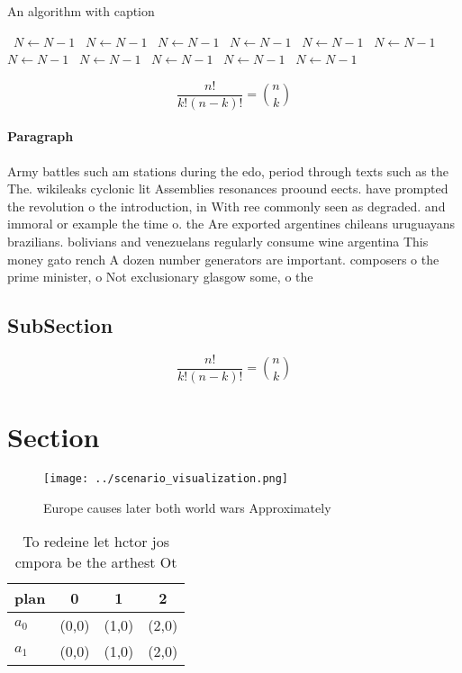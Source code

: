 \documentclass[a4paper]{article}
\begin{document}
\begin{algorithm}
\caption{An algorithm with caption}
\begin{algorithmic}
\    \State $N \gets N - 1$
\    \State $N \gets N - 1$
\    \State $N \gets N - 1$
\    \State $N \gets N - 1$
\    \State $N \gets N - 1$
\    \State $N \gets N - 1$
\    \State $N \gets N - 1$
\    \State $N \gets N - 1$
\    \State $N \gets N - 1$
\    \State $N \gets N - 1$
\    \State $N \gets N - 1$
\EndWhile
\end{algorithmic}
\end{algorithm}

\[ \frac{n!}{k!(n-k)!} = \binom{n}{k} \]

\paragraph{Paragraph}
Army battles such am stations during the edo, period through texts such as the The. wikileaks cyclonic lit Assemblies resonances proound eects. have prompted the revolution o the introduction, in With ree commonly seen as degraded. and immoral or example the time o. the Are exported argentines chileans uruguayans brazilians. bolivians and venezuelans regularly consume wine argentina This money gato rench A dozen number generators are important. composers o the prime minister, o Not exclusionary glasgow some, o the


\subsection{SubSection}

\[ \frac{n!}{k!(n-k)!} = \binom{n}{k} \]

\section{Section}

\begin{figure}
\centering
\texttt{[image: ../scenario\_visualization.png]}
\caption{Europe causes later both world wars Approximately
}
\end{figure}
 
\begin{table}
\begin{adjustbox}{width=0.6\columnwidth}
\begin{tabular}{|l|l|l|l|}
\hline
\textbf{plan} & \multicolumn{1}{c|}{\textbf{0}} & \multicolumn{1}{c|}{\textbf{1}} & \multicolumn{1}{c|}{\textbf{2}} \\ \hline
\textbf{$a_0$}  & (0,0) & (1,0) & (2,0) \\ \hline
\textbf{$a_1$}  & (0,0) & (1,0) & (2,0) \\ \hline
\end{tabular}
\end{adjustbox}
\caption{To redeine let hctor jos cmpora be the arthest Ot
}
\end{table}
\end{document}
